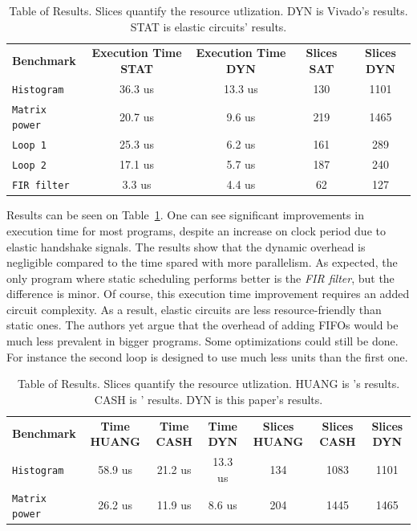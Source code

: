 \documentclass{article}
\begin{document}
\begin{table}
  \hspace{-2cm}
  \begin{tabular}{l c c c c}
    \textbf{Benchmark} & \textbf{Execution Time STAT} & \textbf{Execution Time DYN} & \textbf{Slices SAT} & \textbf{Slices DYN}\\
    \texttt{Histogram} & 36.3 us & 13.3 us & 130 & 1101\\
    \texttt{Matrix power} & 20.7 us & 9.6 us & 219 & 1465\\
    \texttt{Loop 1} & 25.3 us & 6.2 us & 161 & 289\\
    \texttt{Loop 2} & 17.1 us & 5.7 us & 187 & 240\\
    \texttt{FIR filter} & 3.3 us & 4.4 us & 62 & 127
  \end{tabular}
  \caption{Table of Results. Slices quantify the resource utlization. DYN is Vivado's results. STAT is elastic circuits' results.}
  \label{table:results_stat}
\end{table}

Results can be seen on Table~\ref{table:results_stat}. One can see significant improvements in execution time for most programs, despite an increase on clock period due to elastic handshake signals.
The results show that the dynamic overhead is negligible compared to the time spared with more parallelism. As expected, the only program where static scheduling performs better is the \textit{FIR filter}, but the difference is minor.
Of course, this execution time improvement requires an added circuit complexity. As a result, elastic circuits are less resource-friendly than static ones. The authors yet argue that the overhead of adding FIFOs would be much less prevalent in bigger programs. Some optimizations could still be done. For instance the second loop is designed to use much less units than the first one.

\begin{table}
  \hspace{-3cm}
  \begin{tabular}{l c c c c c c}
    \textbf{Benchmark} & \textbf{Time HUANG} & \textbf{Time CASH} & \textbf{Time DYN} & \textbf{Slices HUANG} & \textbf{Slices CASH} & \textbf{Slices DYN}\\
    \texttt{Histogram} & 58.9 us & 21.2 us & 13.3 us & 134 & 1083 & 1101\\
    \texttt{Matrix power} & 26.2 us & 11.9 us & 8.6 us & 204 & 1445 & 1465
  \end{tabular}
  \caption{Table of Results. Slices quantify the resource utlization. HUANG is \cite{DBLP:conf/fpga/HuangITCW13}'s results. CASH is \cite{budiu-tr02}' results. DYN is this paper's results.}
  \label{table:results_dyn}
\end{table}
\end{document}
